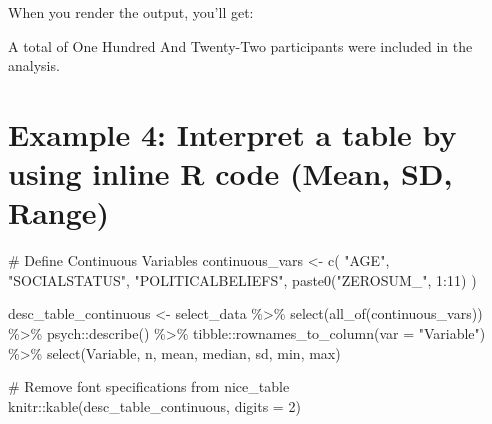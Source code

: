 \documentclass[
  english,
  letterpaper,
  DIV=11,
  numbers=noendperiod]{scrreprt}
\newenvironment{Shaded}{\begin{snugshade}}{\end{snugshade}}
\newcommand{\AttributeTok}[1]{\textcolor[rgb]{0.40,0.45,0.13}{#1}}
\newcommand{\CommentTok}[1]{\textcolor[rgb]{0.37,0.37,0.37}{#1}}
\newcommand{\DecValTok}[1]{\textcolor[rgb]{0.68,0.00,0.00}{#1}}
\newcommand{\FunctionTok}[1]{\textcolor[rgb]{0.28,0.35,0.67}{#1}}
\newcommand{\NormalTok}[1]{\textcolor[rgb]{0.00,0.23,0.31}{#1}}
\newcommand{\OtherTok}[1]{\textcolor[rgb]{0.00,0.23,0.31}{#1}}
\newcommand{\SpecialCharTok}[1]{\textcolor[rgb]{0.37,0.37,0.37}{#1}}
\newcommand{\StringTok}[1]{\textcolor[rgb]{0.13,0.47,0.30}{#1}}
\begin{document}
When you render the output, you'll get:

\begin{Shaded}
\begin{Highlighting}[]
\NormalTok{A total of One Hundred And Twenty{-}Two participants were included in the analysis.}
\end{Highlighting}
\end{Shaded}

\section{Example 4: Interpret a table by using inline R code (Mean, SD,
Range)}\label{example-4-interpret-a-table-by-using-inline-r-code-mean-sd-range}

\begin{Shaded}
\begin{Highlighting}[]
\CommentTok{\# Define Continuous Variables}
\NormalTok{continuous\_vars }\OtherTok{\textless{}{-}} \FunctionTok{c}\NormalTok{(}
  \StringTok{"AGE"}\NormalTok{, }\StringTok{"SOCIALSTATUS"}\NormalTok{, }\StringTok{"POLITICALBELIEFS"}\NormalTok{,}
  \FunctionTok{paste0}\NormalTok{(}\StringTok{"ZEROSUM\_"}\NormalTok{, }\DecValTok{1}\SpecialCharTok{:}\DecValTok{11}\NormalTok{)}
\NormalTok{)}

\NormalTok{desc\_table\_continuous }\OtherTok{\textless{}{-}}\NormalTok{ select\_data }\SpecialCharTok{\%\textgreater{}\%}
  \FunctionTok{select}\NormalTok{(}\FunctionTok{all\_of}\NormalTok{(continuous\_vars)) }\SpecialCharTok{\%\textgreater{}\%}
\NormalTok{  psych}\SpecialCharTok{::}\FunctionTok{describe}\NormalTok{() }\SpecialCharTok{\%\textgreater{}\%}
\NormalTok{  tibble}\SpecialCharTok{::}\FunctionTok{rownames\_to\_column}\NormalTok{(}\AttributeTok{var =} \StringTok{"Variable"}\NormalTok{) }\SpecialCharTok{\%\textgreater{}\%}
  \FunctionTok{select}\NormalTok{(Variable, n, mean, median, sd, min, max)}

\CommentTok{\# Remove font specifications from nice\_table}
\NormalTok{knitr}\SpecialCharTok{::}\FunctionTok{kable}\NormalTok{(desc\_table\_continuous,}
             \AttributeTok{digits =} \DecValTok{2}\NormalTok{)}
\end{Highlighting}
\end{Shaded}
\end{document}
